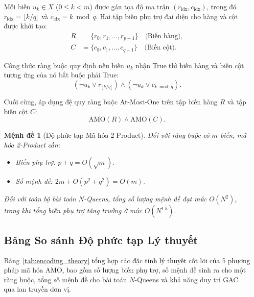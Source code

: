 \documentclass[a4paper,fleqn]{cas-sc}
\newtheorem{proposition}{Mệnh đề}
\begin{document}
Mỗi biến $u_k \in X$ ($0 \le k < m$) được gán tọa độ ma trận $(r_{\text{idx}}, c_{\text{idx}})$, trong đó $r_{\text{idx}} = \lfloor k / q \rfloor$ và $c_{\text{idx}} = k \bmod q$. Hai tập biến phụ trợ đại diện cho hàng và cột được khởi tạo:
\begin{align}
    R &= \{r_0, r_1, \dots, r_{p-1}\} \quad \text{(Biến hàng)},\\
    C &= \{c_0, c_1, \dots, c_{q-1}\} \quad \text{(Biến cột)}.
\end{align}

Công thức ràng buộc quy định nếu biến $u_k$ nhận True thì biến hàng và biến cột tương ứng của nó bắt buộc phải True:
\begin{equation}
    (\neg u_k \lor r_{\lfloor k / q \rfloor}) \land (\neg u_k \lor c_{k \bmod q}).
\end{equation}

Cuối cùng, áp dụng đệ quy ràng buộc At-Most-One trên tập biến hàng $R$ và tập biến cột $C$:
\begin{equation}
    \text{AMO}(R) \land \text{AMO}(C).
\end{equation}

\begin{proposition}[Độ phức tạp Mã hóa 2-Product]
Đối với ràng buộc có $m$ biến, mã hóa 2-Product cần:
\begin{itemize}
    \item Biến phụ trợ: $p + q = O(\sqrt{m})$.
    \item Số mệnh đề: $2m + O(p^2 + q^2) = O(m)$.
\end{itemize}
Đối với toàn bộ bài toán $N$-Queens, tổng số lượng mệnh đề đạt mức $O(N^2)$, trong khi tổng biến phụ trợ tăng trưởng ở mức $O(N^{1.5})$.
\end{proposition}

\subsection{Bảng So sánh Độ phức tạp Lý thuyết}
Bảng~\ref{tab:encoding_theory} tổng hợp các đặc tính lý thuyết cốt lõi của 5 phương pháp mã hóa AMO, bao gồm số lượng biến phụ trợ, số mệnh đề sinh ra cho một ràng buộc, tổng số mệnh đề cho bài toán $N$-Queens và khả năng duy trì GAC qua lan truyền đơn vị.
\end{document}

